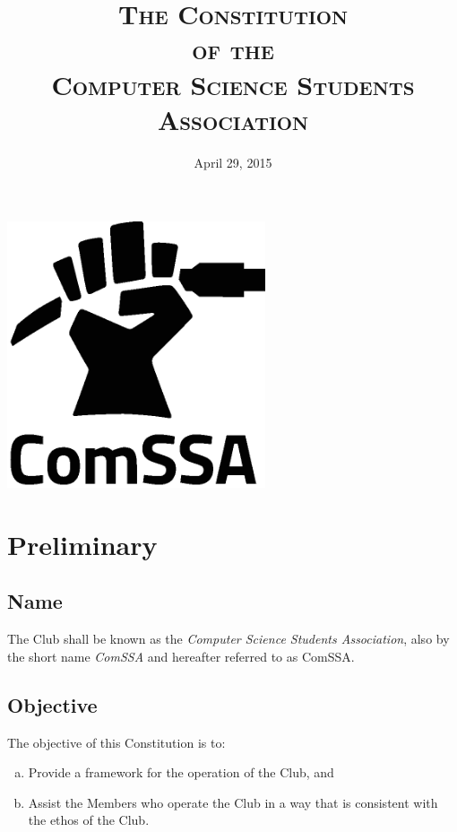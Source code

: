 \documentclass[a4paper,12pt]{article}
\title{\scshape
	The Constitution\\
	of the\\
	Computer Science Students Association
}
\date{April 29, 2015}
\author{} %
\begin{document}
\maketitle

\vspace{1in}

\begin{center}
	\includegraphics[width=3in]{logo/delan/comssalogo_crop_black.eps}
\end{center}

\newpage


\section{Preliminary}

\subsection{Name}

The Club shall be known as the \textit{Computer Science Students Association}, also by the short name \textit{ComSSA} and hereafter referred to as ComSSA.

\subsection{Objective}

The objective of this Constitution is to:

\begin{enumerate}[a)]
	\item Provide a framework for the operation of the Club, and
	\item Assist the Members who operate the Club in a way that is consistent with the ethos of the Club.
\end{enumerate}
\end{document}
